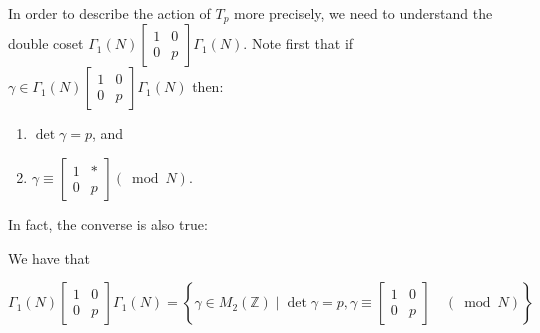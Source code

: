 \begin{remark}
    In order to describe the action of $T_{p}$ more precisely, we need to understand the double coset $\Gamma_{1}(N)\left[\begin{array}{ll}1 & 0 \\ 0 & p\end{array}\right] \Gamma_{1}(N)$. Note first that if $\gamma \in \Gamma_{1}(N)\left[\begin{array}{ll}1 & 0 \\ 0 & p\end{array}\right] \Gamma_{1}(N)$ then:

\begin{enumerate}
  \item $\operatorname{det} \gamma=p$, and

  \item $\gamma \equiv\left[\begin{array}{ll}1 & * \\ 0 & p\end{array}\right](\bmod N)$.

\end{enumerate}


\end{remark}

In fact, the converse is also true:

\begin{proposition}
    We have that

$$
\Gamma_{1}(N)\left[\begin{array}{ll}
1 & 0 \\
0 & p
\end{array}\right] \Gamma_{1}(N)=\left\{\gamma \in M_{2}(\mathbb{Z}) \mid \operatorname{det} \gamma=p, \gamma \equiv\left[\begin{array}{ll}
1 & 0 \\
0 & p
\end{array}\right] \quad(\bmod N)\right\}
$$

\end{proposition}

